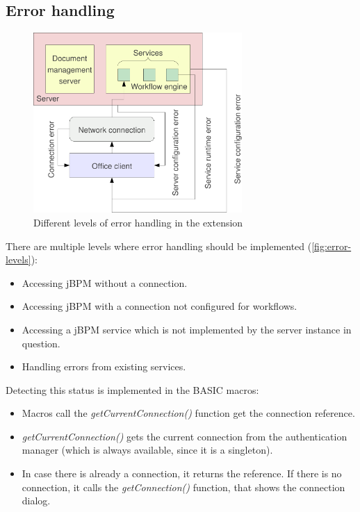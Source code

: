 \subsection{Error handling}

\begin{figure}[H]
\centering
\includegraphics[width=300px,keepaspectratio]{error-levels.pdf}
\caption{Different levels of error handling in the extension}
\label{fig:error-levels}
\end{figure}

There are multiple levels where error handling should be implemented
(\autoref{fig:error-levels}):

\begin{itemize}
\item Accessing jBPM without a connection.
\item Accessing jBPM with a connection not configured for workflows.
\item Accessing a jBPM service which is not implemented by the server instance in question.
\item Handling errors from existing services.
\end{itemize}


Detecting this status is implemented in the BASIC macros:

\begin{itemize}
\item Macros call the \emph{getCurrentConnection()} function get the connection reference.
\item \emph{getCurrentConnection()} gets the current connection from the authentication manager (which is always available, since it is a singleton).
\item In case there is already a connection, it returns the reference. If there is no connection, it calls the \emph{getConnection()} function, that shows the connection dialog.
\end{itemize}

